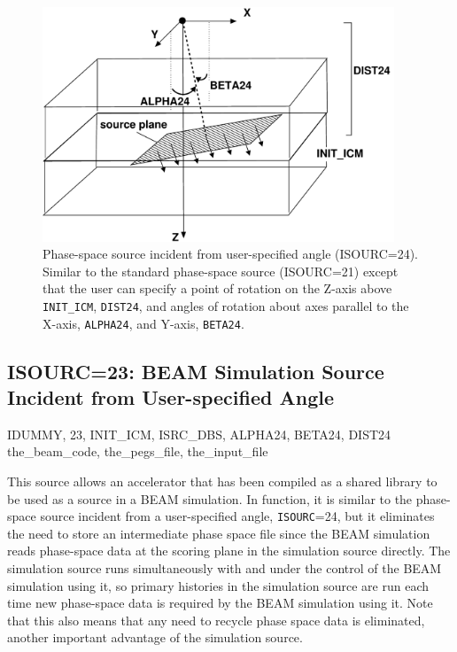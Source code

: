 \documentclass[12pt,twoside]{article}
\newcommand{\cen}[1]{\begin{center} #1 \end{center}                   }
\begin{document}
\begin{figure}[H]
\vspace*{-0.4cm}
\begin{center}
\leavevmode
\includegraphics[height=7cm]{figures/src24}
\caption[ISOURC=24: Phase-space Source Incident from User-specified Angle]
{Phase-space source incident from user-specified angle (ISOURC=24).  Similar to
the standard phase-space source (ISOURC=21) except that the user can specify
a point of rotation on the Z-axis above {\tt INIT\_ICM}, {\tt DIST24}, and
angles of rotation about axes parallel to the X-axis, {\tt ALPHA24}, and
Y-axis, {\tt BETA24}.}
\label{fig_src24}
\end{center}
\end{figure}

\clearpage

\subsection{ISOURC=23: BEAM Simulation Source Incident from User-specified Angle}
\label{Source23}

\cen{IDUMMY, 23, INIT\_ICM, ISRC\_DBS, ALPHA24, BETA24, DIST24\\
the\_beam\_code, the\_pegs\_file, the\_input\_file}

This source allows an accelerator that has been compiled as a shared library to
be used as a source in a BEAM simulation.  In function, it is similar to
the phase-space source incident from a user-specified angle, {\tt ISOURC}=24,
but it eliminates the need to store an
intermediate phase space file since the BEAM simulation reads phase-space data at the
scoring plane in
the simulation source directly.  The simulation source runs simultaneously with
and under the control of the BEAM simulation using it, so primary histories in the
simulation source are run each time new phase-space data is required by the
BEAM simulation using it.  Note that this also means that any need to recycle phase
space data is eliminated, another important advantage of the simulation source.
\end{document}
